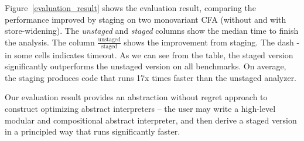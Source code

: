 Figure~\ref{evaluation_result} shows the evaluation result, comparing
the performance improved by staging on two monovariant CFA (without
and with store-widening). The \textit{unstaged} and \textit{staged}
columns show the median time to finish the analysis. The column
$\frac{\text{unstaged}}{\text{staged}}$ shows the improvement from
staging. The dash - in some cells indicates timeout.  As we can see
from the table, the staged version significantly outperforms the
unstaged version on all benchmarks.  On average, the staging produces
code that runs 17x times faster than the unstaged analyzer.


Our evaluation result provides an abstraction without regret
approach to construct optimizing abstract interpreters -- the user may write a
high-level modular and compositional abstract interpreter, and then derive a
staged version in a principled way that runs significantly faster.

